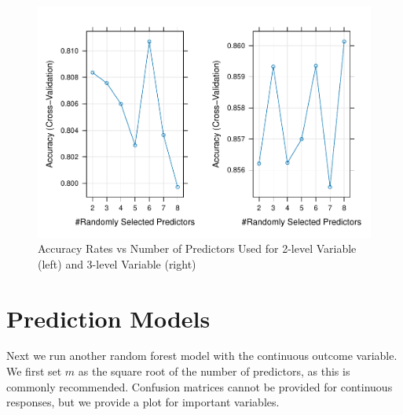 \documentclass[
]{book}
\newenvironment{Shaded}{\begin{snugshade}}{\end{snugshade}}
\newcommand{\AttributeTok}[1]{\textcolor[rgb]{0.13,0.29,0.53}{#1}}
\newcommand{\CommentTok}[1]{\textcolor[rgb]{0.56,0.35,0.01}{\textit{#1}}}
\newcommand{\ConstantTok}[1]{\textcolor[rgb]{0.56,0.35,0.01}{#1}}
\newcommand{\DecValTok}[1]{\textcolor[rgb]{0.00,0.00,0.81}{#1}}
\newcommand{\FunctionTok}[1]{\textcolor[rgb]{0.13,0.29,0.53}{\textbf{#1}}}
\newcommand{\NormalTok}[1]{#1}
\newcommand{\OtherTok}[1]{\textcolor[rgb]{0.56,0.35,0.01}{#1}}
\newcommand{\SpecialCharTok}[1]{\textcolor[rgb]{0.81,0.36,0.00}{\textbf{#1}}}
\begin{document}
\begin{figure}

{\centering \includegraphics[width=1\linewidth,height=1\textheight]{bookdown-demo_files/figure-latex/rfplots-1} 

}

\caption{Accuracy Rates vs Number of Predictors Used for 2-level Variable (left) and 3-level Variable (right)}\label{fig:rfplots}
\end{figure}

\hypertarget{prediction-models}{%
\section{Prediction Models}\label{prediction-models}}

Next we run another random forest model with the continuous outcome variable. We first set \(m\) as the square root of the number of predictors, as this is commonly recommended. Confusion matrices cannot be provided for continuous responses, but we provide a plot for important variables.

\begin{Shaded}
\end{Shaded}
\end{document}

